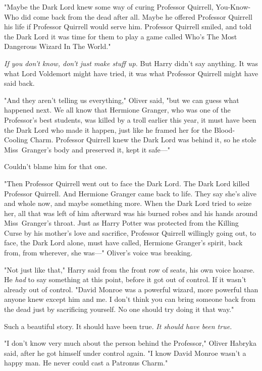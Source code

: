 "Maybe the Dark Lord knew some way of curing Professor Quirrell, You-Know-Who
did come back from the dead after all. Maybe he offered Professor Quirrell his
life if Professor Quirrell would serve him. Professor Quirrell smiled, and told
the Dark Lord it was time for them to play a game called Who's The Most
Dangerous Wizard In The World."

\emph{If you don't know, don't just make stuff up.} But Harry didn't say
anything. It was what Lord Voldemort might have tried, it was what Professor
Quirrell might have said back.

"And they aren't telling us everything," Oliver said, "but we can guess what
happened next. We all know that Hermione Granger, who was one of the
Professor's best students, was killed by a troll earlier this year, it must
have been the Dark Lord who made it happen, just like he framed her for the
Blood-Cooling Charm. Professor Quirrell knew the Dark Lord was behind it, so he
stole Miss~Granger's body and preserved it, kept it safe---"

Couldn't blame him for that one.

"Then Professor Quirrell went out to face the Dark Lord. The Dark Lord killed
Professor Quirrell. And Hermione Granger came back to life. They say she's
alive and whole now, and maybe something more. When the Dark Lord tried to
seize her, all that was left of him afterward was his burned robes and his
hands around Miss~Granger's throat. Just as Harry Potter was protected from the
Killing Curse by his mother's love and sacrifice, Professor Quirrell willingly
going out, to face, the Dark Lord alone, must have called, Hermione Granger's
spirit, back from, from wherever, she was---" Oliver's voice was breaking.

"Not just like that," Harry said from the front row of seats, his own voice
hoarse. He \emph{had} to say something at this point, before it got out of
control. If it wasn't already out of control. "David Monroe was a powerful
wizard, more powerful than anyone knew except him and me. I don't think you can
bring someone back from the dead just by sacrificing yourself. No one should
try doing it that way."

Such a beautiful story. It should have been true. \emph{It should have been
true.}

"I don't know very much about the person behind the Professor," Oliver Habryka
said, after he got himself under control again. "I know David Monroe wasn't a
happy man. He never could cast a Patronus Charm."

